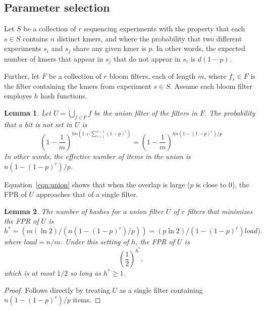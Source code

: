 \documentclass[11pt]{article}
\newtheorem{lem}{Lemma}
\begin{document}
\subsection{Parameter selection}

Let $S$ be a collection of $r$ sequencing experiments with the property that each $s \in S$ contains $n$ distinct kmers, and where the probability that two different experiments $s_i$ and $s_j$ share any given kmer is $p$. In other words, the expected number of kmers that appear in $s_j$ that do not appear in $s_i$ is $d(1-p)$.

Further, let $F$ be a collection of $r$ bloom filters, each of length $m$, where $f_s \in F$ is the filter containing the kmers from  experiment $s \in S$. Assume each bloom filter employes $h$ hash functions.

\begin{lem}
Let $U = \bigcup_{f\in F} f$ be the union filter of the filters in $F$. The probability that a bit is not set in $U$ is
\begin{equation}\label{eqn:union}
\left(1 - \frac{1}{m}\right)^{hn\left(1+\sum_{i=1}^{r-1} (1-p)^i\right)} =
\left(1 - \frac{1}{m}\right)^{hn\left(1 - (1-p)^r\right)/p}
\end{equation}
In other words, the effective number of items in the union is $n(1-(1-p)^r)/p$.
\end{lem}
Equation~\ref{eqn:union} shows that when the overlap is large ($p$ is close to 0), the FPR of  $U$ approaches that of a single filter.

\begin{lem}
The  number of hashes for a union filter $U$ of $r$ filters that minimizes the FPR of $U$ is
\begin{equation}
h^* = (m (\ln 2) / (n(1-(1-p)^r)/p)) = 
(p\ln 2) / (1-(1-p)^r)\textit{load}).
\end{equation}
where $\textit{load} = n / m$.
Under this setting of $h$, the FPR of $U$ is 
\begin{equation}
\left(\frac{1}{2}\right)^{h^*},
\end{equation}
which is at most $1/2$ so long as $h^* \geq 1$.
\end{lem}
\begin{proof}
Follows directly by treating $U$ as a single filter containing $n(1-(1-p)^r)/p$ items.
\end{proof}
\end{document}
